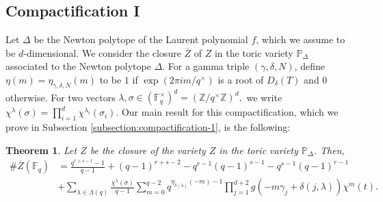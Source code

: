\documentclass[11pt, reqno]{amsart}
\theoremstyle{plain}
\newtheorem{theo}{Theorem}[section]
\theoremstyle{definition}
\newcommand{\Z}{\mathbb{Z}}
\newcommand{\Ps}{\mathbb{P}}
\newcommand{\F}{\mathbb{F}}
\newcommand{\ga}{\gamma}
\begin{document}
\subsection*{Compactification I }
Let $\Delta$ be the Newton polytope of the Laurent polynomial $f$, which we assume to be $d$-dimensional.  
We consider the closure $\overline{Z}$ of $Z$ in the toric variety $\Ps_{\Delta}$ associated to the Newton polytope $\Delta$. 
For a gamma triple $(\ga,\delta,N)$, define $\eta(m)=\eta_{\ga,\delta,N}(m)$ to be $1$ if $\exp(2\pi i m/q^{\times})$ is a root of $D_{\delta}(T)$ and $0$ otherwise. 
For two vectors $\lambda,\sigma \in (\F_q^\times)^{d}= \left(\Z/q^\times\Z\right)^{d},$ we write $\chi^{\lambda}(\sigma)= \prod_{i=1}^{d}\chi^{\lambda_i}(\sigma_i)$.
Our main result for this compactification, which we prove in Subsection \ref{subsection:compactification-1}, is the following:
\begin{theo}\label{theo:intro-compcatification-1}
Let $\overline{Z}$ be the closure of the variety $Z$ in the toric variety $\Ps_{\Delta}$. Then,
\begin{align*}
    \#\overline{Z}(\F_q)&= \frac{q^{r+s-1}-1}{q-1}+ (q-1)^{r+s-2} -q^{r-1}(q-1)^{s-1}- q^{s-1}(q-1)^{r-1}\nonumber\\
     &+\sum_{\lambda \in \Lambda(q)}  \frac{\chi^{\lambda}(\sigma)}{q-1}\sum_{m=0}^{q-2}q^{\eta_{\delta(\lambda)}(-m)-1} \prod_{j=1}^{d+2}g\left(-m\gamma_j + \delta(j,\lambda)\right) \chi^{m}\left(t\right).
\end{align*}
\end{theo}
\end{document}
